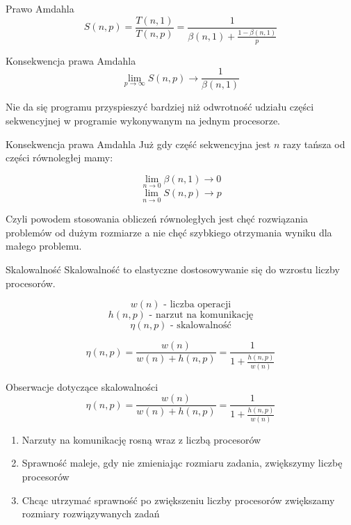 \documentclass{beamer}
\begin{document}
\begin{frame}{Prawo Amdahla}
  $$ S(n,p) = \frac{T(n,1)}{T(n,p)} = \frac{1}{\beta(n,1) + \frac{1 - \beta(n,1)}{p}} $$
\end{frame}

\begin{frame}{Konsekwencja prawa Amdahla}
  $$ \lim_{p \rightarrow \infty}S(n,p) \rightarrow \frac{1}{\beta(n,1)} $$

  Nie da się programu przyspieszyć bardziej niż odwrotność udziału części sekwencyjnej w programie wykonywanym na jednym procesorze.
\end{frame}

\begin{frame}{Konsekwencja prawa Amdahla}
  Już gdy część sekwencyjna jest $n$ razy tańsza od części równoległej mamy:

  $$ \lim_{n \rightarrow 0} \beta(n,1) \rightarrow 0 $$
  $$ \lim_{n \rightarrow 0} S(n,p) \rightarrow p $$

  Czyli powodem stosowania obliczeń równoległych jest chęć rozwiązania problemów od dużym rozmiarze a nie chęć szybkiego otrzymania wyniku dla małego problemu.
\end{frame}

\begin{frame}{Skalowalność}
  Skalowalność to elastyczne dostosowywanie się do wzrostu liczby procesorów.

  $$ w(n) \mbox{ - liczba operacji}$$
  $$ h(n, p) \mbox{ - narzut na komunikację}$$
  $$ \eta(n,p) \mbox{ - skalowalność} $$


  $$ \eta(n,p) = \frac{w(n)}{w(n) + h(n,p)} = \frac{1}{1 + \frac{h(n,p)}{w(n)}} $$
\end{frame}

\begin{frame}{Obserwacje dotyczące skalowalności}
  $$ \eta(n,p) = \frac{w(n)}{w(n) + h(n,p)} = \frac{1}{1 + \frac{h(n,p)}{w(n)}} $$

  \begin{enumerate}
  \item Narzuty na komunikację rosną wraz z liczbą procesorów
  \item Sprawność maleje, gdy nie zmieniając rozmiaru zadania, zwiększymy liczbę procesorów
  \item Chcąc utrzymać sprawność po zwiększeniu liczby procesorów zwiększamy rozmiary rozwiązywanych zadań
  \end{enumerate}
\end{frame}
\end{document}
